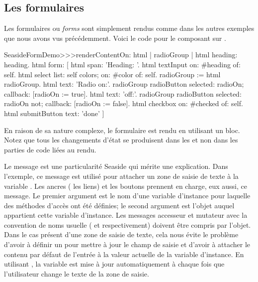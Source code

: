 \documentclass[a4paper,10pt,twoside]{book}
\begin{document}
\subsection{Les formulaires}

Les formulaires ou \emph{forms} sont simplement rendus comme dans les
autres exemples que nous avons vus précédemment.
Voici le code pour le composant  sur
.


\begin{code}{} %
SeasideFormDemo>>>renderContentOn: html
	| radioGroup |
	html heading: heading.
	html form: [
		html span: 'Heading: '.
		html textInput on: #heading of: self.
		html select
			list: self colors;
			on: #color of: self.
		radioGroup := html radioGroup.
		html text: 'Radio on:'.
		radioGroup radioButton
			selected: radioOn;
			callback: [radioOn := true].
		html text: 'off:'.
		radioGroup radioButton
			selected: radioOn not;
			callback: [radioOn := false].
		html checkbox on: #checked of: self.
		html submitButton
			text: 'done' ]
\end{code}{}

En raison de sa nature complexe, le formulaire est rendu en utilisant
un bloc.
Notez que tous les changements d'état se produisent dans les
\callbacks et non dans les parties de code liées au rendu.

Le message  est une particularité Seaside
qui mérite une explication.
Dans l'exemple, ce message est utilisé pour attacher un zone de saisie
de texte à la variable .
Les ancres (\ie{} les liens) et les boutons prennent en charge, eux
aussi, ce message.
Le premier argument est le nom d'une variable d'instance pour laquelle
des méthodes d'accès ont été définies; le second argument est l'objet auquel 
appartient cette variable d'instance.
Les messages accesseur et mutateur avec la convention de noms usuelle
(\ie{}  et  respectivement) 
doivent être compris par l'objet.
Dans le cas présent d'une zone de saisie de texte, 
cela nous évite le problème d'avoir à définir un \callback
pour mettre à jour le champ de saisie et d'avoir à attacher le
contenu par défaut de l'entrée à la valeur actuelle de la variable
d'instance.
En utilisant , la variable  est mise à jour 
automatiquement à chaque fois que l'utilisateur change le texte de la zone de saisie.
\end{document}
